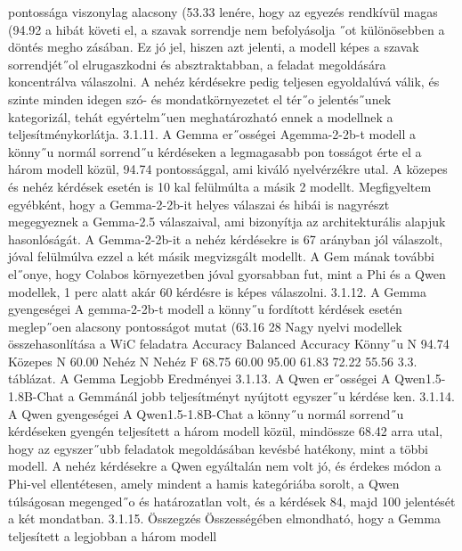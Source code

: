 \documentclass[12pt]{report}
\theoremstyle{definition}
\begin{document}
 pontossága viszonylag alacsony (53.33%
lenére, hogy az egyezés rendkívül magas (94.92%
 a hibát követi el, a szavak sorrendje nem befolyásolja ˝ot különösebben a döntés megho
zásában. Ez jó jel, hiszen azt jelenti, a modell képes a szavak sorrendjét˝ol elrugaszkodni
 és absztraktabban, a feladat megoldására koncentrálva válaszolni. A nehéz kérdésekre
 pedig teljesen egyoldalúvá válik, és szinte minden idegen szó- és mondatkörnyezetet el
tér˝o jelentés˝unek kategorizál, tehát egyértelm˝uen meghatározható ennek a modellnek a
 teljesítménykorlátja.
 3.1.11. A Gemma er˝osségei
 Agemma-2-2b-t modell a könny˝u normál sorrend˝u kérdéseken a legmagasabb pon
tosságot érte el a három modell közül, 94.74%
 pontossággal, ami kiváló nyelvérzékre utal. A közepes és nehéz kérdések esetén is 10%
kal felülmúlta a másik 2 modellt. Megfigyeltem egyébként, hogy a Gemma-2-2b-it helyes
 válaszai és hibái is nagyrészt megegyeznek a Gemma-2.5 válaszaival, ami bizonyítja az
 architekturális alapjuk hasonlóságát. A Gemma-2-2b-it a nehéz kérdésekre is 67%
 arányban jól válaszolt, jóval felülmúlva ezzel a két másik megvizsgált modellt. A Gem
mának további el˝onye, hogy Colabos környezetben jóval gyorsabban fut, mint a Phi és a
 Qwen modellek, 1 perc alatt akár 60 kérdésre is képes válaszolni.
 3.1.12. A Gemma gyengeségei
 A gemma-2-2b-t modell a könny˝u fordított kérdések esetén meglep˝oen alacsony
 pontosságot mutat (63.16%
 28
Nagy nyelvi modellek összehasonlítása a WiC feladatra
 Accuracy Balanced Accuracy
 Könny˝u N
 94.74%
 Közepes N 60.00%
 Nehéz N
 Nehéz F
 68.75%
 60.00%
 95.00%
 61.83%
 72.22%
 55.56%
 3.3. táblázat. A Gemma Legjobb Eredményei
 3.1.13. A Qwen er˝osségei
 A Qwen1.5-1.8B-Chat a Gemmánál jobb teljesítményt nyújtott egyszer˝u kérdése
ken.
 3.1.14. A Qwen gyengeségei
 A Qwen1.5-1.8B-Chat a könny˝u normál sorrend˝u kérdéseken gyengén teljesített a
 három modell közül, mindössze 68.42%
 arra utal, hogy az egyszer˝ubb feladatok megoldásában kevésbé hatékony, mint a többi
 modell. A nehéz kérdésekre a Qwen egyáltalán nem volt jó, és érdekes módon a Phi-vel
 ellentétesen, amely mindent a hamis kategóriába sorolt, a Qwen túlságosan megenged˝o
 és határozatlan volt, és a kérdések 84, majd 100%
 jelentését a két mondatban.
 3.1.15. Összegzés
 Összességében elmondható, hogy a Gemma teljesített a legjobban a három modell
\end{document}
